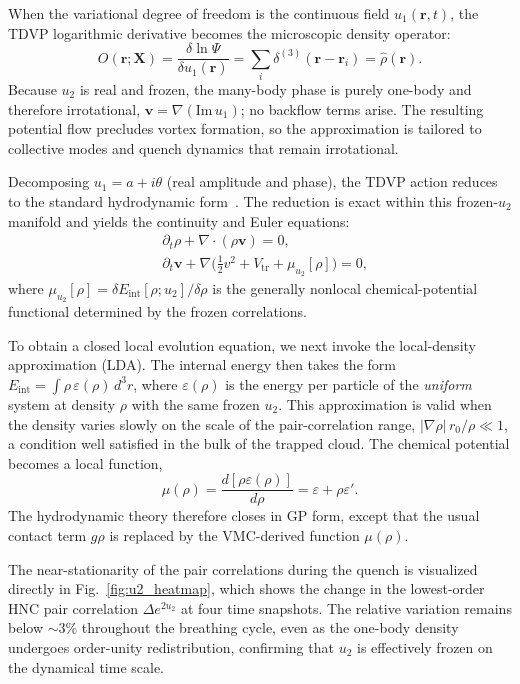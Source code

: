 \documentclass[aps,prl,twocolumn,superscriptaddress,longbibliography]{revtex4-2}
\newcommand{\br}{\mathbf{r}}
\newcommand{\bv}{\mathbf{v}}
\newcommand{\bx}{\mathbf{X}}
\begin{document}
When the variational degree of freedom is the continuous field
$u_1(\br,t)$, the TDVP logarithmic derivative becomes the microscopic
density operator:
\begin{equation}
O(\br;\bx) = \frac{\delta\ln\Psi}{\delta u_1(\br)}
= \sum_i\delta^{(3)}(\br-\br_i) = \hat\rho(\br).
\label{eq:O_rho}
\end{equation}
Because $u_2$ is real and frozen, the many-body phase is purely
one-body and therefore irrotational, $\bv = \nabla(\mathrm{Im}\, u_1)$;
no backflow terms arise.  The resulting potential flow precludes vortex
formation, so the approximation is tailored to collective modes and
quench dynamics that remain irrotational.

Decomposing $u_1 = a + i\theta$ (real amplitude and phase), the TDVP
action reduces to the standard hydrodynamic form~\cite{SM_note}.  The
reduction is exact within this frozen-$u_2$ manifold and yields the
continuity and Euler equations:
\begin{align}
&\partial_t\rho + \nabla\!\cdot(\rho\bv) = 0,
\label{eq:cont}\\
&\partial_t\bv + \nabla\!\Big(\tfrac{1}{2}v^2 + V_{\mathrm{tr}}
+ \mu_{u_2}[\rho]\Big) = 0,
\label{eq:euler}
\end{align}
where $\mu_{u_2}[\rho] = \delta E_{\mathrm{int}}[\rho;u_2]/\delta\rho$
is the generally nonlocal chemical-potential functional determined by
the frozen correlations.

To obtain a closed local evolution equation, we next invoke the
local-density approximation (LDA).  The internal energy then takes the
form $E_{\mathrm{int}} = \int\!\rho\,\varepsilon(\rho)\,d^3r$, where
$\varepsilon(\rho)$ is the energy per particle of the \emph{uniform}
system at density $\rho$ with the same frozen $u_2$.  This
approximation is valid when the density varies slowly on the scale of
the pair-correlation range, $|\nabla\rho|\,r_0/\rho \ll 1$, a
condition well satisfied in the bulk of the trapped cloud.  The
chemical potential becomes a local function,
\begin{equation}
\mu(\rho) = \frac{d[\rho\varepsilon(\rho)]}{d\rho}
= \varepsilon + \rho\varepsilon'.
\label{eq:mu}
\end{equation}
The hydrodynamic theory therefore closes in GP form, except that the
usual contact term $g\rho$ is replaced by the VMC-derived function
$\mu(\rho)$.

The near-stationarity of the pair correlations during the quench is
visualized directly in Fig.~\ref{fig:u2_heatmap}, which shows the
change in the lowest-order HNC pair correlation $\Delta e^{2u_2}$ at
four time snapshots.  The relative variation remains below $\sim 3\%$
throughout the breathing cycle, even as the one-body density undergoes
order-unity redistribution, confirming that $u_2$ is effectively
frozen on the dynamical time scale.
\end{document}
